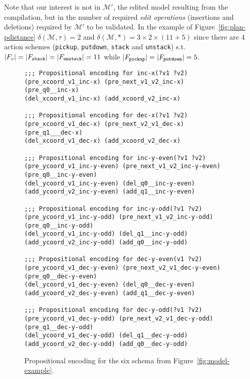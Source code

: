 \documentclass[letterpaper]{article} %
\begin{document}
Note that our interest is not in $\mathcal{M}'$, the edited model resulting from the compilation, but in the number of required {\em edit operations} (insertions and deletions) required by $\mathcal{M}'$ to be validated. In the example of Figure~\ref{fig:plan-pdistance} $\delta(\mathcal{M},\tau)=2$ and $\delta(\mathcal{M},*)=3\times 2\times (11+5)$ since there are 4 action schemes ({\small\tt pickup}, {\small\tt putdown}, {\small\tt stack} and {\small\tt unstack}) s.t. $|F_v|=|F_{\tt stack}|=|F_{\tt unstack}|=11$ while $|F_{\tt pickup}|=|F_{\tt putdown}|=5$.

\begin{figure}
\begin{tiny}
\begin{verbatim}
;;; Propositional encoding for inc-x(?v1 ?v2)
(pre_xcoord_v1_inc-x) (pre_next_v1_v2_inc-x) 
(pre_q0__inc-x)
(del_xcoord_v1_inc-x) (add_xcoord_v2_inc-x)

;;; Propositional encoding for dec-x(?v1 ?v2)
(pre_xcoord_v1_dec-x) (pre_next_v2_v1_dec-x) 
(pre_q1___dec-x)
(del_xcoord_v1_dec-x) (add_xcoord_v2_dec-x)

;;; Propositional encoding for inc-y-even(?v1 ?v2)
(pre_ycoord_v1_inc-y-even) (pre_next_v1_v2_inc-y-even)
(pre_q0__inc-y-even)
(del_ycoord_v1_inc-y-even) (del_q0__inc-y-even)
(add_ycoord_v2_inc-y-even) (add_q1__inc-y-even)

;;; Propositional encoding for inc-y-odd(?v1 ?v2)
(pre_ycoord_v1_inc-y-odd) (pre_next_v1_v2_inc-y-odd) 
(pre_q0__inc-y-odd)
(del_ycoord_v1_inc-y-odd) (del_q1__inc-y-odd)
(add_ycoord_v2_inc-y-odd) (add_q0__inc-y-odd)

;;; Propositional encoding for dec-y-even(v1 ?v2)
(pre_ycoord_v1_dec-y-even) (pre_next_v2_v1_dec-y-even)
(pre_q0__dec-y-even)
(del_ycoord_v1_dec-y-even) (del_q0__dec-y-even)
(add_ycoord_v2_dec-y-even) (add_q1__dec-y-even)

;;; Propositional encoding for dec-y-odd(?v1 ?v2)
(pre_ycoord_v1_dec-y-odd) (pre_next_v2_v1_dec-y-odd)
(pre_q1__dec-y-odd)
(del_ycoord_v1_dec-y-odd) (del_q1__dec-y-odd)
(add_ycoord_v2_dec-y-odd) (add_q0__dec-y-odd)
\end{verbatim}
\end{tiny}
 \caption{\small Propositional encoding for the six schema from Figure~\ref{fig:model-example}.}
\label{fig:encoding}
\end{figure}
\end{document}
